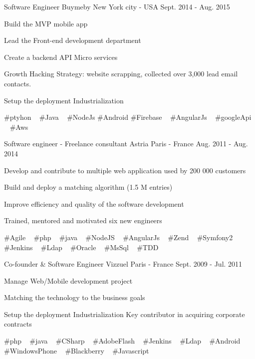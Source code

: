 \begin{cventries}
  \cventry
    {Software Engineer} %
    {Buymeby} %
    {New York city - USA} %
    {Sept. 2014 - Aug. 2015} %
    {
      \begin{cvitems} %
        \item {Build the MVP mobile app}
        \item {Lead the Front-end development department}
        \item {Create a backend API Micro services}
        \item {Growth Hacking Strategy: website scrapping, collected over 3,000 lead email contacts.}
        \item {Setup the deployment Industrialization}
      \end{cvitems}
    }
    {
      \#ptyhon ~
      \#Java ~
      \#NodeJs
      \#Android
      \#Firebase ~
      \#AngularJs ~
      \#googleApi ~
      \#Aws ~
    }

  \cventry
    {Software engineer - Freelance consultant} %
    {Astria} %
    {Paris - France} %
    {Aug. 2011 - Aug. 2014} %
    {
      \begin{cvitems} %
        \item {Develop and contribute to multiple web application used by 200 000 customers}
        \item {Build and deploy a matching algorithm (1.5 M entries)}
        \item {Improve efficiency and quality of the software development}
        \item {Trained, mentored and motivated six new engineers}
      \end{cvitems}
    }
    {
      \#Agile ~
      \#php ~
      \#java ~
      \#NodeJS ~
      \#AngularJs ~
      \#Zend ~
      \#Symfony2 ~
      \#Jenkins ~
      \#Ldap ~
      \#Oracle ~
      \#MsSql ~
      \#TDD
    }

  \cventry
    {Co-founder \& Software Engineer} %
    {Vizzuel} %
    {Paris - France} %
    {Sept. 2009 - Jul. 2011} %
    {
      \begin{cvitems} %
        \item {Manage Web/Mobile development project}
        \item {Matching the technology to the business goals}
        \item {Setup the deployment Industrialization Key contributor in acquiring corporate contracts}
      \end{cvitems}
    }
    {
      \#php ~
      \#java ~
      \#CSharp ~
      \#AdobeFlash ~
      \#Jenkins ~
      \#Ldap ~
      \#Android ~
      \#WindowsPhone ~
      \#Blackberry ~
      \#Javascript
    }

\end{cventries}

